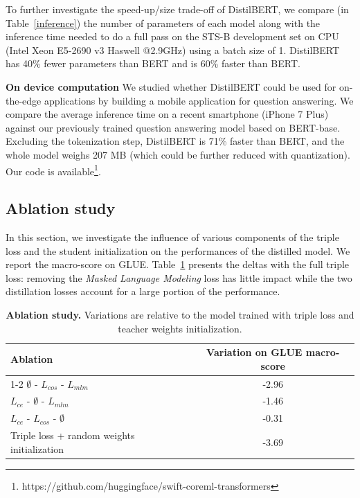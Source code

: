 \documentclass{article}
\begin{document}
To further investigate the speed-up/size trade-off of DistilBERT, we compare (in Table~\ref{inference}) the number of parameters of each model along with the inference time needed to do a full pass on the STS-B development set on CPU (Intel Xeon E5-2690 v3 Haswell @2.9GHz) using a batch size of 1. DistilBERT has 40\% fewer parameters than BERT and is 60\% faster than BERT.


\textbf{On device computation}
We studied whether DistilBERT could be used for on-the-edge applications by building a mobile application for question answering. We compare the average inference time on a recent smartphone (iPhone 7 Plus) against our previously trained question answering model based on BERT-base. Excluding the tokenization step, DistilBERT is 71\% faster than BERT, and the whole model weighs 207 MB (which could be further reduced with quantization). Our code is available\footnote{https://github.com/huggingface/swift-coreml-transformers}.


\subsection{Ablation study}

In this section, we investigate the influence of various components of the triple loss and the student initialization on the performances of the distilled model. We report the macro-score on GLUE. Table~\ref{ablation} presents the deltas with the full triple loss: removing the \textit{Masked Language Modeling} loss has little impact while the two distillation losses account for a large portion of the performance.

\begin{table}
  \caption{\textbf{Ablation study.} Variations are relative to the model trained with triple loss and teacher weights initialization.}
  \label{ablation}
  \centering
  \begin{tabular}{lc}
    \toprule
    Ablation & \textbf{Variation on GLUE macro-score}\\
    \cmidrule(r){1-2}
    $\emptyset$ - $L_{cos}$ - $L_{mlm}$ & -2.96\\
    $L_{ce}$ - $\emptyset$ - $L_{mlm}$ & -1.46\\
    $L_{ce}$ - $L_{cos}$ - $\emptyset$ & -0.31\\
    Triple loss + random weights initialization & -3.69\\
    \bottomrule
  \end{tabular}
\end{table}
\end{document}
